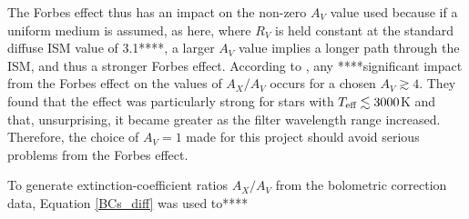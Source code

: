 \documentclass[12pt, a4paper]{report}
\begin{document}
The Forbes effect thus has an impact on the non-zero $A_{V}$ value used because if a uniform medium is assumed, as here, where $R_{V}$ is held constant at the standard diffuse ISM value of 3.1****, a larger $A_{V}$ value implies a longer path through the ISM, and thus a stronger Forbes effect. According to \cite{2008PASP..120..583G}, any ****significant impact from the Forbes effect on the values of $A_{X}/A_{V}$ occurs for a chosen $A_{V} \gtrsim 4$. They found that the effect was particularly strong for stars with $T_{\textnormal{eff}} \lesssim 3000$K and that, unsurprising, it became greater as the filter wavelength range increased. Therefore, the choice of $A_{V} = 1$ made for this project should avoid serious problems from the Forbes effect.

To generate extinction-coefficient ratios $A_{X}/A_{V}$ from the bolometric correction data, Equation \ref{BCs_diff} was used to****
\end{document}
